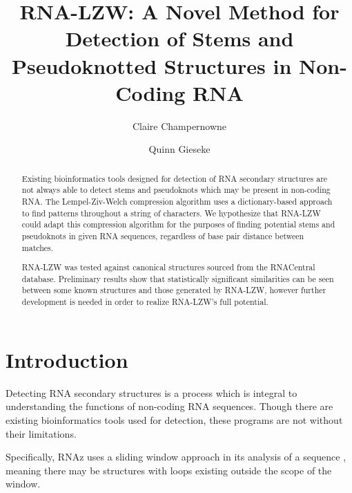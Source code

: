 \documentclass[sigconf]{acmart}
\begin{document}
\title{RNA-LZW: A Novel Method for Detection of Stems and Pseudoknotted Structures in Non-Coding RNA}

\author{Claire Champernowne}

\author{Quinn Gieseke}

\renewcommand{\shortauthors}{Champernowne and Gieseke, et al.}

\begin{abstract}
Existing bioinformatics tools designed for detection of RNA secondary structures are not always able to detect stems and pseudoknots which may be present in non-coding RNA.  The Lempel-Ziv-Welch compression algorithm uses a dictionary-based approach to find patterns throughout a string of characters. We hypothesize that RNA-LZW could adapt this compression algorithm for the purposes of finding potential stems and pseudoknots in given RNA sequences, regardless of base pair distance between matches. 

RNA-LZW was tested against canonical structures sourced from the RNACentral database. Preliminary results show that statistically significant similarities can be seen between some known structures and those generated by RNA-LZW, however further development is needed in order to realize RNA-LZW's full potential.
\end{abstract}


\maketitle




\section{Introduction}
Detecting RNA secondary structures is a process which is integral to understanding the functions of non-coding RNA sequences. Though there are existing bioinformatics tools used for detection, these programs are not without their limitations. 

Specifically, RNAz uses a sliding window approach in its analysis of a sequence \cite{RNAZ2} \cite{Fast}, meaning there may be structures with loops existing outside the scope of the window.
\end{document}
